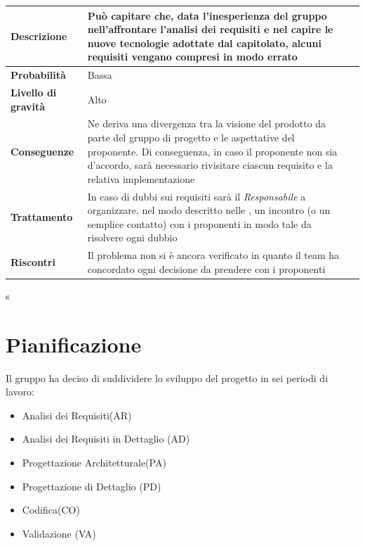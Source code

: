 \begin{center}
	
	\begin{tabular}{|>{\centering}m{4cm} ||>{\centering}m{8cm} |>{\centering\arraybackslash}m{0pt}@{}|}
		\hline
		\textbf{Descrizione} & Può capitare che, data l'inesperienza del gruppo nell'affrontare l'analisi dei requisiti e nel capire le nuove tecnologie adottate dal capitolato, alcuni requisiti vengano compresi in modo errato & \\[2ex]
		\hline	
		\textbf{Probabilità} & Bassa & \\[1ex]
		\hline
		\textbf{Livello di gravità} & Alto & \\[1ex]
		\hline
		\textbf{Conseguenze} & Ne deriva una divergenza tra la visione
		del prodotto da parte del gruppo di progetto e le aspettative del
		proponente. Di conseguenza, in caso il proponente non sia d'accordo,
		sarà necessario rivisitare ciascun requisito e la relativa
		implementazione & \\[1ex]
		\hline
		\textbf{Trattamento} & In caso di dubbi sui requisiti sarà il  \emph{Responsabile}  a organizzare, nel modo descritto nelle \normediprogetto, un incontro (o un semplice contatto) con i proponenti in modo tale da risolvere ogni dubbio & \\[1ex] 
		\hline
		\textbf{Riscontri} & Il problema non si è ancora verificato in quanto il team ha concordato ogni decisione da prendere con i proponenti  & \\[1ex]
		\hline
	\end{tabular}
s	
\end{center}



\section{Pianificazione}
Il gruppo ha deciso di suddividere lo sviluppo del progetto in sei periodi di lavoro:

\begin{itemize}
\item Analisi dei Requisiti(AR)
\item Analisi dei Requisiti in Dettaglio (AD)
\item Progettazione Architetturale(PA)
\item Progettazione di Dettaglio (PD)
\item Codifica(CO)
\item Validazione (VA)
\end{itemize}

